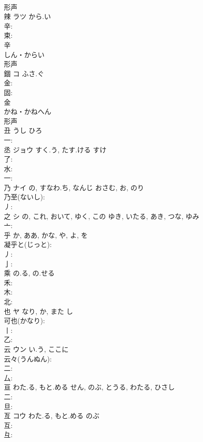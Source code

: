 \documentclass[8pt]{extreport}
\begin{document}
\begin{CJK}{UTF8}{min}
\\	形声 
\\	辣	ラツ	から.い		
\\	辛: 
\\	束: 
\\	辛	
\\	しん・からい	
\\	形声 
\\	錮	コ	ふさ.ぐ		
\\	金: 
\\	固: 
\\	金	
\\	かね・かねへん	
\\	形声 
\\	丑		うし	ひろ		
\\	一: 
\\	丞	ジョウ	すく.う, たす.ける	すけ	
\\	了: 
\\	水: 
\\	一: 
\\	乃	ナイ	の, すなわ.ち, なんじ	おさむ, お, のり	
\\	乃至(ないし): 
\\	丿: 
\\	之	シ	の, これ, おいて, ゆく, この	ゆき, いたる, あき, つな, ゆみ	
\\	亠: 
\\	乎		か, ああ, かな, や, よ, を				
\\	凝乎と(じっと): 
\\	丿: 
\\	亅: 
\\	乘		の.る, の.せる				
\\	禾: 
\\	木: 
\\	北: 
\\	也	ヤ	なり, か, また	し	
\\	可也(かなり): 
\\	丨: 
\\	乙: 
\\	云	ウン	い.う, ここに		
\\	云々(うんぬん): 
\\	二: 
\\	厶: 
\\	亘		わた.る, もと.める	せん, のぶ, とうる, わたる, ひさし		
\\	二: 
\\	旦: 
\\	亙	コウ	わた.る, もと.める	のぶ	
\\	互: 
\\	彑: 

\end{CJK}
\end{document}
